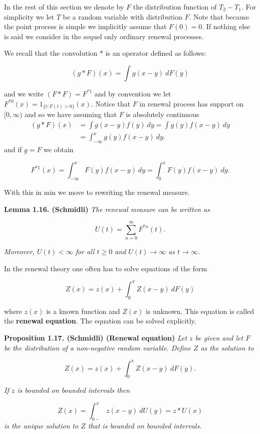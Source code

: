 \documentclass[a4paper,10pt,openany]{book}
\begin{document}
In the rest of this section we denote by \(F\) the distribution function of \(T_2 − T_1\). For simplicity we let \(T\) be a random variable with distribution \(F\). Note that because the point process is simple we implicitly assume that \(F(0) = 0\). If nothing else is said we consider in the sequel only ordinary renewal processes.

We recall that the convolution \(*\) is an operator defined as follows:

\[
(g * F)(x)=\int g(x-y)\ dF(y)
\]

and we write \((F * F)=F^{*1}\) and by convention we let \(F^{*0}(x)=1_{\{t : F(t)>0\}}(x)\). Notice that \(F\) in renewal process has support on \([0,\infty)\) and so we have assuming that \(F\) is absolutely continuous
\begin{align*}
(g*F)(x)&=\int g(x-y)f(y)\ dy=\int g(y)f(x-y)\ dy\\
&=\int_{-\infty}^x  g(y)f(x-y)\ dy.
\end{align*}
and if \(g=F\) we obtain

\[
F^{*1}(x)=\int_{-\infty}^x F(y)f(x-y)\ dy=\int_0^x F(y)f(x-y)\ dy.
\]

With this in min we move to rewriting the renewal measure.

\textbf{Lemma 1.16. (Schmidli)} \emph{The renewal measure can be written as}

\[
U(t)=\sum_{n=0}^\infty F^{*n}(t).
\]

\emph{Moreover, \(U(t)<\infty\) for all \(t\ge 0\) and \(U(t)\to\infty\) as \(t\to \infty\).}

In the renewal theory one often has to solve equations of the form

\[
Z(x)=z(x)+\int_{0}^x Z(x-y)\ dF(y)
\]

where \(z(x)\) is a known function and \(Z(x)\) is unknown. This equation is called the \textbf{renewal equation}. The equation can be solved explicitly.

\textbf{Proposition 1.17. (Schmidli) (Renewal equation)} \emph{Let \(z\) be given and let \(F\) be the distribution of a non-negative random variable. Define \(Z\) as the solution to}

\[
Z(x)=z(x)+\int_{0}^x Z(x-y)\ dF(y).
\]

\emph{If \(z\) is bounded on bounded intervals then}

\[
Z(x)=\int_{0-}^x z(x-y)\ dU(y)=z*U(x)
\]
\emph{is the unique solution to \(Z\) that is bounded on bounded intervals.}
\end{document}
